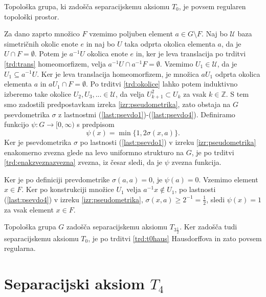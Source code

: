\documentclass[mat1]{fmfdelo}
\newcommand{\Z}{\mathbb Z}
\newcommand{\Ucurl}{\mathcal{U}}
\begin{document}
\begin{izrek}\label{izr:t3pol}
	Topološka grupa, ki zadošča separacijskemu aksiomu $T_0$, je povsem regularen topološki prostor.
\end{izrek}

\begin{dokaz}
Za dano zaprto množico $F$ vzemimo poljuben element $a \in G\setminus F$.
Naj bo $\Ucurl$ baza simetričnih okolic enote $e$ in naj bo $U$ taka odprta okolica elementa $a$, da je $U \cap F = \emptyset$. Potem je $a^{-1}U$ okolica enote $e$ in, ker je leva translacija po trditvi \ref{trd:trans} homeomorfizem, velja $a^{-1}U \cap a^{-1}F = \emptyset$. Vzemimo $U_1 \in \Ucurl$, da je $U_1 \subseteq a^{-1}U$. Ker je leva translacija homeomorfizem, je množica $aU_1$ odprta okolica elementa $a$ in $aU_1 \cap F = \emptyset$. Po trditvi \ref{trd:okolice} lahko potem induktivno izberemo take okolice $U_2, U_3,... \in \Ucurl$, da velja $U_{k+1}^2 \subset U_k$ za vsak $k \in \Z$. S tem smo zadostili predpostavkam izreka \ref{izr:pseudometrika}, zato obstaja na $G$ psevdometrika $\sigma$ z lastnostmi (\ref{last:psevdo1})-(\ref{last:psevdo4}). Definiramo funkcijo $\psi\colon G \to [0, \infty)$ s predpisom
\[ \psi(x) = \min\lbrace 1, 2\sigma(x, a)\rbrace. \]
Ker je psevdometrika $\sigma$ po lastnosti (\ref{last:psevdo1}) v izreku \ref{izr:pseudometrika} enakomerno zvezna glede na levo uniformno strukturo na $G$, je po trditvi \ref{trd:enakzveznazvezna} zvezna, iz česar sledi, da je $\psi$ zvezna funkcija.

Ker je po definiciji prevdometrike $\sigma(a, a) = 0$, je $\psi(a) = 0$.
Vzemimo element $x \in F$. Ker po konstrukciji množice $U_1$ velja $a^{-1}x \notin U_1$, po lastnosti (\ref{last:psevdo4}) v izreku \ref{izr:pseudometrika}, $\sigma(x, a) \geq 2^{-1} = \frac{1}{2}$, sledi $\psi(x) = 1$ za vsak element $x \in F$.

Topološka grupa $G$ zadošča separacijskemu aksiomu $T_{3\frac{1}{2}}$. Ker zadošča tudi separacijskemu aksiomu $T_0$, je po trditvi \ref{trd:t0haus} Hausdorffova in zato povsem regularna.
\end{dokaz}

\section{Separacijski aksiom $T_4$}
\end{document}
